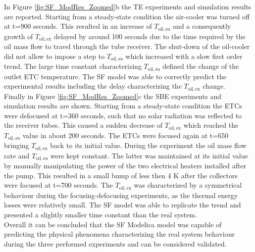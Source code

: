 \documentclass[final,3p,times,review]{elsarticle}
\begin{document}
In Figure \ref{fig:SF_ModRes_Zoomed}b the TE experiments and simulation results are reported. Starting from a steady-state condition the air-cooler was turned off at t=900 seconds. This resulted in an increase of $T_\mathrm{oil,su}$ and a consequently growth of $T_\mathrm{oil,ex}$ delayed by around 100 seconds due to the time required by the oil mass flow to travel through the tube receiver. The shut-down of the oil-cooler did not allow to impose a step to $T_\mathrm{oil,su}$ which increased with a slow first order trend. The large time constant characterizing $T_\mathrm{oil,su}$ defined the change of the outlet ETC temperature. The SF model was able to correctly predict the experimental results including  the delay characterizing the $T_\mathrm{oil,ex}$ change.\\
Finally in Figure \ref{fig:SF_ModRes_Zoomed}c the SBE experiments and simulation results are shown. Starting from a steady-state condition the ETCs were defocused at t=360 seconds, such that no solar radiation was reflected to the receiver tubes. This caused a sudden decrease of $T_\mathrm{oil,ex}$ which reached the $T_\mathrm{oil,su}$ value in about 200 seconds. The ETCs were focused again at t=650 bringing $T_\mathrm{oil,ex}$ back to its initial value. During the experiment the oil mass flow rate and $T_\mathrm{oil,su}$ were kept constant. The latter was maintained at its initial value by manually manipulating the power of the two electrical heaters installed after the pump. This resulted in a small bump of less then 4 K after the collectors were focused at t=700 seconds. The $T_\mathrm{oil,ex}$ was characterized by a symmetrical behaviour during the focusing-defocusing experiments, as the thermal energy losses were relatively small. The SF model was able to replicate the trend and presented a slightly smaller time constant than the real system.\\
Overall it can be concluded that the SF Modelica model was capable of predicting the physical phenomena characterizing the real system behaviour during the three performed experiments and can be considered validated.
%
\end{document}
